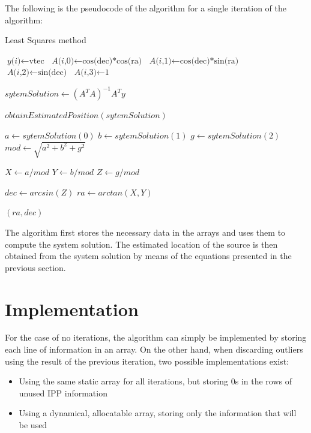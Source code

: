 The following is the pseudocode of the algorithm for a single iteration of the algorithm:

\begin{algorithm}
	\caption{Least Squares method}\label{leastSquaresPseudo}
	\begin{algorithmic}[1]
		
		\State $\textit{y(i)} \gets \text{vtec}$
		\State $\textit{A(i,0)} \gets \text{cos(dec)*cos(ra)}$
		\State $\textit{A(i,1)} \gets \text{cos(dec)*sin(ra)}$
		\State $\textit{A(i,2)} \gets \text{sin(dec)}$
		\State $\textit{A(i,3)} \gets \text{1}$
		\EndFor
		
		\State $\textit{sytemSolution} \gets (A^{T}A)^{-1}A^{T}y$
		
		\Return $obtainEstimatedPosition(sytemSolution)$
		\EndProcedure

			\State $\textit{a} \gets sytemSolution(0)$
			\State $\textit{b} \gets sytemSolution(1)$
			\State $\textit{g} \gets sytemSolution(2)$
			\State $\textit{mod} \gets \sqrt{a^{2} + b^{2} + g^{2}}$ 
			
			
			\State $\textit{X} \gets a/mod$
			\State $\textit{Y} \gets b/mod$
			\State $\textit{Z} \gets g/mod$
			
			\State $\textit{dec} \gets arcsin(Z)$
			\State $\textit{ra} \gets arctan(X,Y)$
			
			\Return $(ra, dec)$
		\EndProcedure
	\end{algorithmic}
\end{algorithm}

The algorithm first stores the necessary data in the arrays and uses them to compute the system solution. The estimated location of the source is then obtained from the system solution by means of the equations presented in the previous section.

\clearpage

\section{Implementation}

For the case of no iterations, the algorithm can simply be implemented by storing each line of information in an array. On the other hand, when discarding outliers using the result of the previous iteration, two possible implementations exist:

\begin{itemize}
	\item Using the same static array for all iterations, but storing 0s in the rows of unused IPP information
	\item Using a dynamical, allocatable array, storing only the information that will be used
\end{itemize}

